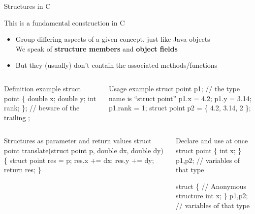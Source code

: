 \begin{Coupe}
\begin{frame}[fragile]{Structures in C}
  \vspace{-.8\baselineskip}
  \begin{block}{This is a fundamental construction in C}
    \begin{itemize}
    \item Group differing aspects of a given concept, just like Java objects\\
      {\small{} We speak of \textbf{structure members} and
        \textbf{object fields}}
    \item But they (usually) don't contain the associated methods/functions
    \end{itemize}
  \end{block}\vspace{-.4\baselineskip}
  \begin{columns}
    \begin{column}{.35\linewidth} 
  \begin{boitecode}{Definition example}
struct point \{
  double x;
  double y;
  int rank;
\}; // beware of the trailing ;
  \end{boitecode}     
    \end{column}
    \begin{column}{.56\linewidth} 
  \begin{boitecode}{Usage example}
struct point p1; // the type name is ``struct point''
p1.x = 4.2; 
p1.y = 3.14;
p1.rank = 1;
struct point p2 = \{ 4.2, 3.14, 2 \};
  \end{boitecode}     
    \end{column}
  \end{columns}\vspace{-.6\baselineskip}
  \begin{columns}
    \begin{column}{.55\linewidth}
  \begin{boitecode}{Structures as parameter and return values}
struct point translate(struct point p, 
                       double dx, double dy) \{
  struct point res = p;
  res.x += dx;
  res.y += dy;
  return res;
\}
  \end{boitecode}               
    \end{column}
    \begin{column}{.37\linewidth}
      \begin{boitecode}{Declare and use at once}
struct point \{
  int x;
\} p1,p2; // variables of that type
      \end{boitecode}
      \vspace{-.8\baselineskip}
      \begin{boitecode}{}
struct \{ // Anonymous structure 
  int x;
\} p1,p2; // variables of that type
      \end{boitecode}
    \end{column}


\end{columns}
\end{frame}
\end{Coupe}
